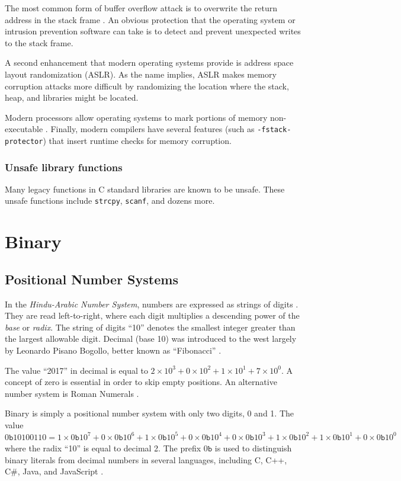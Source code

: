 \documentclass{book}
\begin{document}
The most common form of buffer overflow attack is to overwrite the return address in the stack frame \cite{apple}. An obvious protection that the operating system or intrusion prevention software can take is to detect and prevent unexpected writes to the stack frame.

A second enhancement that modern operating systems provide is address space layout randomization (ASLR). As the name implies, ASLR makes memory corruption attacks more difficult by randomizing the location where the stack, heap, and libraries might be located.

Modern processors allow operating systems to mark portions of memory non-executable \cite{apple}. Finally, modern compilers have several features (such as \texttt{-fstack-protector}) that insert runtime checks for memory corruption.

\subsection{Unsafe library functions}
Many legacy functions in C standard libraries are known to be unsafe. These unsafe functions include \texttt{strcpy}, \texttt{scanf}, and dozens more.

\chapter{Binary}

\section{Positional Number Systems}
In the \textit{Hindu-Arabic Number System}, numbers are expressed as strings of digits \cite{ji_2010}. They are read left-to-right, where each digit multiplies a descending power of the \textit{base} or \textit{radix}. The string of digits ``10'' denotes the smallest integer greater than the largest allowable digit. Decimal (base 10) was introduced to the west largely by Leonardo Pisano Bogollo, better known as ``Fibonacci'' \cite{seligman_2011} \cite{mastin_2010}.

The value ``2017'' in decimal is equal to $2 \times 10^3 + 0 \times 10^2 + 1 \times 10^1 + 7 \times 10^0$. A concept of zero is essential in order to skip empty positions. An alternative number system is Roman Numerals \cite{ji_2010}.

Binary is simply a positional number system with only two digits, 0 and 1. The value $0\texttt{b}10100110 = 1 \times 0\texttt{b}10^7 + 0 \times 0\texttt{b}10^6 + 1 \times 0\texttt{b}10^5 + 0 \times 0\texttt{b}10^4 + 0 \times 0\texttt{b}10^3 + 1 \times 0\texttt{b}10^2 + 1 \times 0\texttt{b}10^1 + 0 \times 0\texttt{b}10^0$ where the radix ``10'' is equal to decimal 2. The prefix $0\texttt{b}$ is used to distinguish binary literals from decimal numbers in several languages, including C, C++, C\#, Java, and JavaScript \cite{oracle_binary_literal}.
\end{document}
